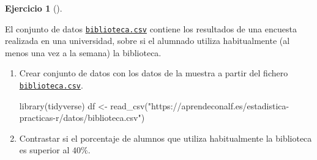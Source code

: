 \documentclass[
  a4paper,
]{scrreport}
\newenvironment{Shaded}{\begin{snugshade}}{\end{snugshade}}
\newcommand{\FunctionTok}[1]{\textcolor[rgb]{0.28,0.35,0.67}{#1}}
\newcommand{\NormalTok}[1]{\textcolor[rgb]{0.00,0.23,0.31}{#1}}
\newcommand{\OtherTok}[1]{\textcolor[rgb]{0.00,0.23,0.31}{#1}}
\newcommand{\StringTok}[1]{\textcolor[rgb]{0.13,0.47,0.30}{#1}}
\theoremstyle{definition}
\newtheorem{exercise}{Ejercicio}[chapter]
\theoremstyle{remark}
\begin{document}
\begin{exercise}[]\protect\hypertarget{exr-contraste-hipotesis-proporcion-uso-biblioteca}{}\label{exr-contraste-hipotesis-proporcion-uso-biblioteca}

El conjunto de datos
\href{https://aprendeconalf.es/estadistica-practicas-r/datos/biblioteca.csv}{\texttt{biblioteca.csv}}
contiene los resultados de una encuesta realizada en una universidad,
sobre si el alumnado utiliza habitualmente (al menos una vez a la
semana) la biblioteca.

\begin{enumerate}
\def\labelenumi{\alph{enumi}.}
\item
  Crear conjunto de datos con los datos de la muestra a partir del
  fichero
  \href{https://aprendeconalf.es/estadistica-practicas-r/datos/biblioteca.csv}{\texttt{biblioteca.csv}}.

  \begin{tcolorbox}[enhanced jigsaw, coltitle=black, left=2mm, colback=white, leftrule=.75mm, toptitle=1mm, breakable, bottomrule=.15mm, titlerule=0mm, bottomtitle=1mm, title=\textcolor{quarto-callout-tip-color}{\faLightbulb}\hspace{0.5em}{Solución}, arc=.35mm, toprule=.15mm, rightrule=.15mm, colframe=quarto-callout-tip-color-frame, opacityback=0, colbacktitle=quarto-callout-tip-color!10!white, opacitybacktitle=0.6]

\begin{Shaded}
\begin{Highlighting}[]
\FunctionTok{library}\NormalTok{(tidyverse)}
\NormalTok{df }\OtherTok{\textless{}{-}} \FunctionTok{read\_csv}\NormalTok{(}\StringTok{"https://aprendeconalf.es/estadistica{-}practicas{-}r/datos/biblioteca.csv"}\NormalTok{)}
\end{Highlighting}
\end{Shaded}

  \end{tcolorbox}
\item
  Contrastar si el porcentaje de alumnos que utiliza habitualmente la
  biblioteca es superior al \(40\%\).

  \begin{tcolorbox}[enhanced jigsaw, coltitle=black, left=2mm, colback=white, leftrule=.75mm, toptitle=1mm, breakable, bottomrule=.15mm, titlerule=0mm, bottomtitle=1mm, title=\textcolor{quarto-callout-note-color}{\faInfo}\hspace{0.5em}{Ayuda}, arc=.35mm, toprule=.15mm, rightrule=.15mm, colframe=quarto-callout-note-color-frame, opacityback=0, colbacktitle=quarto-callout-note-color!10!white, opacitybacktitle=0.6]


\end{tcolorbox}
\end{enumerate}
\end{exercise}
\end{document}
